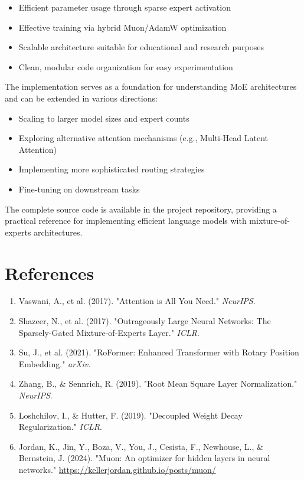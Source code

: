 \documentclass[11pt,a4paper]{article}
\begin{document}
\begin{itemize}
    \item Efficient parameter usage through sparse expert activation
    \item Effective training via hybrid Muon/AdamW optimization
    \item Scalable architecture suitable for educational and research purposes
    \item Clean, modular code organization for easy experimentation
\end{itemize}

The implementation serves as a foundation for understanding MoE architectures and can be extended in various directions:
\begin{itemize}
    \item Scaling to larger model sizes and expert counts
    \item Exploring alternative attention mechanisms (e.g., Multi-Head Latent Attention)
    \item Implementing more sophisticated routing strategies
    \item Fine-tuning on downstream tasks
\end{itemize}

The complete source code is available in the project repository, providing a practical reference for implementing efficient language models with mixture-of-experts architectures.

\section*{References}

\begin{enumerate}
    \item Vaswani, A., et al. (2017). "Attention is All You Need." \textit{NeurIPS}.
    \item Shazeer, N., et al. (2017). "Outrageously Large Neural Networks: The Sparsely-Gated Mixture-of-Experts Layer." \textit{ICLR}.
    \item Su, J., et al. (2021). "RoFormer: Enhanced Transformer with Rotary Position Embedding." \textit{arXiv}.
    \item Zhang, B., \& Sennrich, R. (2019). "Root Mean Square Layer Normalization." \textit{NeurIPS}.
    \item Loshchilov, I., \& Hutter, F. (2019). "Decoupled Weight Decay Regularization." \textit{ICLR}.
    \item Jordan, K., Jin, Y., Boza, V., You, J., Cesista, F., Newhouse, L., \& Bernstein, J. (2024). "Muon: An optimizer for hidden layers in neural networks." \url{https://kellerjordan.github.io/posts/muon/}
\end{enumerate}
\end{document}
